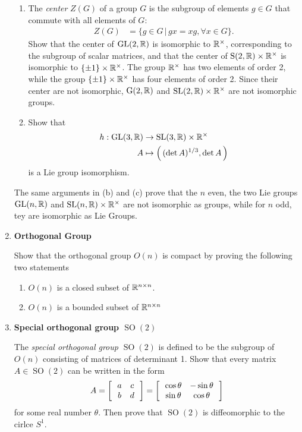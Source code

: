 \documentclass[12pt,a4paper]{report}
\begin{document}
\begin{enumerate}[label=\textbf{15.\arabic*.}]
\begin{enumerate}[label=(\arabic*)]
		\item The \textit{center} $Z(G)$ of a group $G$ is the subgroup of elements $g \in G$ that commute with all elements of $G$:
		\begin{align*}
			Z(G) &= \{g\in G\,|\, gx=xg, \forall x \in G\}.
		\end{align*}Show that the center of $\operatorname{GL}(2,\mathbb{R})$ is isomorphic to $\mathbb{R}^\times$, corresponding to the subgroup of scalar matrices, and that the center of $\operatorname{S}(2,\mathbb{R})\times\mathbb{R}^\times$ is isomorphic to $\{\pm 1\}\times\mathbb{R}^\times$.  The group $\mathbb{R}^\times$ has two elements of order 2, while the group $\{\pm 1\}\times\mathbb{R}^\times$ has four elements of order 2.  Since their center are not isomorphic, $\operatorname{G}(2,\mathbb{R})$ and $\operatorname{SL}(2,\mathbb{R}) \times \mathbb{R}^\times$ are not isomorphic groups.
		
		\item Show that
		\begin{align*}
			h: \operatorname{GL}(3,\mathbb{R}) &\to \operatorname{SL}(3,\mathbb{R}) \times \mathbb{R}^\times \\
			A &\mapsto \left (\, (\det A)^{1/3}, \det A \,\right )
		\end{align*}is a Lie group isomorphism.
	
	\end{enumerate}
	
	The same arguments in (b) and (c) prove that the $n$ even, the two Lie groups $\operatorname{GL}(n,\mathbb{R})$ and $\operatorname{SL}(n,\mathbb{R})\times \mathbb{R}^\times$ are not isomorphic as groups, while for $n$ odd, tey are isomorphic as Lie Groups.
	
	\item \textbf{Orthogonal Group}
	
	Show that the orthogonal group $O(n)$ is compact by proving the following two statements
	
	\begin{enumerate}[label=(\alph*)]
	
		\item $O(n)$ is a closed subset of $\mathbb{R}^{n \times n}$.
		\item $O(n)$ is a bounded subset of $\mathbb{R}^{n\times n}$
	
	\end{enumerate}
	
	\item \textbf{Special orthogonal group $\operatorname{SO}(2)$}
	
	The \textit{special orthogonal group $\operatorname{SO}(2)$} is defined to be the subgroup of $O(n)$ consisting of matrices of determinant 1.  Show that every matrix $A \in \operatorname{SO}(2)$ can be written in the form
	\begin{align*}
		A = \left [\,  \begin{array}{c c} a&c \\ b & d \end{array}  \,\right ]=\left [\,  \begin{array}{c c} \cos \theta&-\sin\theta \\ \sin\theta & \cos\theta \end{array}  \,\right ]
	\end{align*}for some real number $\theta$.  Then prove that $\operatorname{SO}(2)$ is diffeomorphic to the cirlce $S^1$.
	

\end{enumerate}
\end{document}
